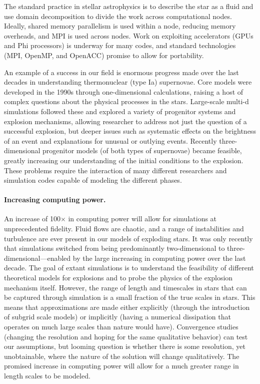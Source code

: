 \documentclass[11pt,twocolumn]{article}
\begin{document}
The standard practice in stellar astrophysics is to describe the star
as a fluid and use domain decomposition to divide the work across
computational nodes.  Ideally, shared memory parallelism is used
within a node, reducing memory overheads, and MPI is used across
nodes.  Work on exploiting accelerators (GPUs and Phi processors) is
underway for many codes, and standard technologies (MPI, OpenMP, and
OpenACC) promise to allow for portability.

An example of a success in our field is enormous progress made over
the last decades in understanding thermonuclear (type Ia) supernovae.
Core models were developed in the 1990s through one-dimensional
calculations, raising a host of complex questions about the physical
processes in the stars.  Large-scale multi-d simulations followed
these and explored a variety of progenitor systems and explosion
mechanisms, allowing researcher to address not just the question of a
successful explosion, but deeper issues such as systematic effects on
the brightness of an event and explanations for unusual or outlying
events.  Recently three-dimensional progenitor models (of both types
of supernovae) became feasible, greatly increasing our understanding
of the initial conditions to the explosion.  These problems require
the interaction of many different researchers and simulation codes
capable of modeling the different phases.  

\paragraph*{Increasing computing power.}

An increase of 100$\times$ in computing power will allow for 
simulations at unprecedented fidelity. Fluid flows are chaotic, and a
range of instabilities and turbulence are ever present in our models
of exploding stars. It was only recently that simulations switched
from being predominantly two-dimensional to
three-dimensional---enabled by the large increasing in computing power
over the last decade.  The goal of extant simulations is to understand
the feasibility of different theoretical models for explosions and to
probe the physics of the explosion mechanism itself.  However, the
range of length and timescales in stars that can be captured through
simulation is a small fraction of the true scales in stars.  This
means that approximations are made either explicitly (through the
introduction of subgrid scale models) or implicitly (having a
numerical dissipation that operates on much large scales than nature
would have).  Convergence studies (changing the resolution and hoping
for the same qualitative behavior) can test our assumptions, but
looming question is whether there is some resolution, yet
unobtainable, where the nature of the solution will change
qualitatively.  The promised increase in computing power will allow
for a much greater range in length scales to be modeled.
\end{document}
